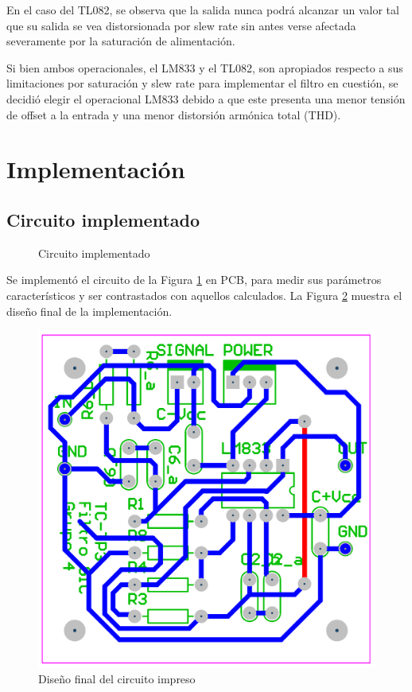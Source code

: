 En el caso del TL082, se observa que la salida nunca podrá alcanzar un valor tal que su salida se vea distorsionada por slew rate sin antes verse afectada severamente por la saturación de alimentación. 

Si bien ambos operacionales, el LM833 y el TL082, son apropiados respecto a sus limitaciones por saturación y slew rate para implementar el filtro en cuestión, se decidió elegir el operacional LM833 debido a que este presenta una menor tensión de offset a la entrada y una menor distorsión armónica total (THD).

\section{Implementación}
\subsection{Circuito implementado}
\begin{figure}[ht]
\centering

\caption{Circuito implementado}
\label{1_circuito_implementado}
\end{figure}

Se implementó el circuito de la Figura \ref{1_circuito_implementado} en PCB, para medir sus parámetros característicos y ser contrastados con aquellos calculados. La Figura \ref{1_pcb} muestra el diseño final de la implementación. 

\begin{figure}[ht]
\centering
\includegraphics[scale=0.4]{../parte1/informe/resources/pcb}
\caption{Diseño final del circuito impreso}
\label{1_pcb}
\end{figure}

